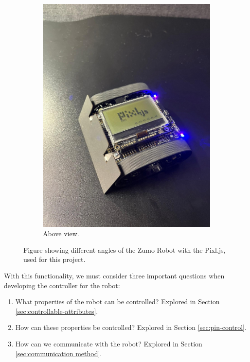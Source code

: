 \documentclass{l4proj}
\begin{document}
\begin{figure}
\begin{subfigure}{0.24\textwidth}
        \includegraphics[width=\textwidth]{images/robot-above.jpg}
        \caption{Above view.}
        \label{fig:above-view}  
    \end{subfigure}
    \caption{Figure showing different angles of the Zumo Robot with the Pixl.js, used for this project.}
    \label{fig:robot-views}
\end{figure}

With this functionality, we must consider three important questions when developing the controller for the robot:
\begin{enumerate}
    \item What properties of the robot can be controlled? Explored in Section \ref{sec:controllable-attributes}.
    \item How can these properties be controlled? Explored in Section \ref{sec:pin-control}.
    \item How can we communicate with the robot? Explored in Section \ref{sec:communication method}.
\end{enumerate}
\end{document}
